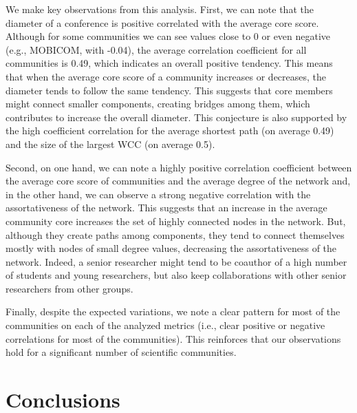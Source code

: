 \documentclass[letterpaper]{www13-companion-accepted}
\begin{document}
We make key observations from this analysis. First, we can note that the diameter of a conference is positive correlated with the average core score. Although for some communities
we can see values close to 0 or even negative (e.g., MOBICOM, with -0.04), the average correlation coefficient for all communities is 0.49, which indicates an overall
positive tendency. This means that when the average core score of a community increases or decreases, the diameter tends to follow the same tendency. This suggests that core 
members might connect smaller components, creating bridges among them, which contributes to increase the overall diameter. This conjecture is also supported by the high coefficient
correlation for the average shortest path (on average 0.49) and the size of the largest WCC (on average 0.5).

Second, on one hand, we can note a highly positive correlation coefficient between the average core score of communities and the average degree of the network and, in the
other hand, we can 
observe a strong negative correlation with the assortativeness of the network. This suggests that an increase in the average community core increases the set of highly connected
nodes in the network. But, although they create paths among components, they tend to connect themselves mostly with nodes of small degree values, decreasing the assortativeness of the
network. Indeed, a senior researcher might tend to be coauthor of a high number of students and young researchers, but also keep collaborations with other senior researchers from
other groups.

Finally, despite the expected variations, we note a clear pattern for most of the communities on each of the analyzed metrics (i.e., clear positive or negative correlations for most of the
communities). This reinforces that our observations hold for a significant number of scientific communities. 


% 

\section{Conclusions}
\end{document}

